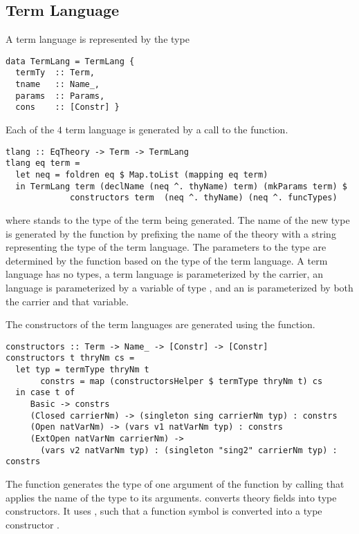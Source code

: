 \subsection{Term Language}
A term language is represented by the type 
\begin{verbatim}
data TermLang = TermLang {
  termTy  :: Term,
  tname   :: Name_,
  params  :: Params,
  cons    :: [Constr] }
\end{verbatim}
Each of the $4$ term language is generated by a call to the  function. 
\begin{verbatim}
tlang :: EqTheory -> Term -> TermLang
tlang eq term =
  let neq = foldren eq $ Map.toList (mapping eq term) 
  in TermLang term (declName (neq ^. thyName) term) (mkParams term) $
             constructors term  (neq ^. thyName) (neq ^. funcTypes)
\end{verbatim}
where  stands to the type of the term being generated. The name of the new type is generated by the function  by prefixing the name of the theory with a string representing the type of the term language. The parameters to the type are determined by the function  based on the type of the term language. A  term language has no types, a  term language is parameterized by the carrier, an  language is parameterized by a variable of type , and an  is parameterized by both the carrier and that  variable. 

The constructors of the term languages are generated using the  function. 
\begin{verbatim}
constructors :: Term -> Name_ -> [Constr] -> [Constr]
constructors t thryNm cs =
  let typ = termType thryNm t
       constrs = map (constructorsHelper $ termType thryNm t) cs
  in case t of
     Basic -> constrs
     (Closed carrierNm) -> (singleton sing carrierNm typ) : constrs
     (Open natVarNm) -> (vars v1 natVarNm typ) : constrs
     (ExtOpen natVarNm carrierNm) -> 
       (vars v2 natVarNm typ) : (singleton "sing2" carrierNm typ) : constrs 
\end{verbatim}
The function  generates the type of one argument of the function by calling  that applies the name of the type to its arguments.  converts theory fields into type constructors. It uses , such that a function symbol  is converted into a type constructor . 

